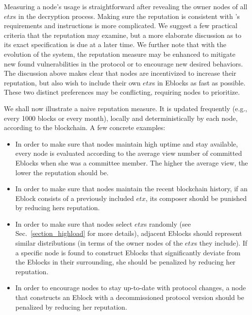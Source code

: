 
Measuring a node's usage is straightforward after revealing the owner nodes of all $etx$s in the decryption process. Making sure the reputation is consistent with \nameNS's requirements and instructions is more complicated. We suggest a few practical criteria that the reputation may examine, but a more elaborate discussion as to its exact specification is due at a later time. We further note that with the evolution of the system, the reputation measure may be enhanced to mitigate new found vulnerabilities in the protocol or to encourage new desired behaviors. The discussion above makes clear that nodes are incentivized to increase their reputation, but also wish to include their own $etx$s in Eblocks as fast as possible. These two distinct preferences may be conflicting, requiring nodes to prioritize.

We shall now illustrate a naive reputation measure. It is updated frequently (e.g., every 1000 blocks or every month), locally and deterministically by each node, according to the blockchain. A few concrete examples:
\begin{itemize}
\item In order to make sure that nodes maintain high uptime and stay available, every node is evaluated according to the average view number of committed Eblocks when she was a committee member. The higher the average view, the lower the reputation should be.
\item In order to make sure that nodes maintain the recent blockchain history, if an Eblock consists of a previously included $etx$, its composer should be punished by reducing hers reputation.
\item In order to make sure that nodes select $etx$s randomly (see Sec.~\ref{section_highload} for more details), adjacent Eblocks should represent similar distributions (in terms of the owner nodes of the $etx$s they include). If a specific node is found to construct Eblocks that significantly deviate from the Eblocks in their surrounding, she should be penalized by reducing her reputation.
\item In order to encourage nodes to stay up-to-date with protocol changes, a node that constructs an Eblock with a decommissioned protocol version should be penalized by reducing her reputation.
\end{itemize}


